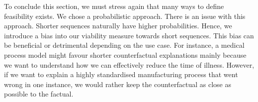 \documentclass[./../../paper.tex]{subfiles}
\begin{document}
To conclude this section, we must stress again that many ways to define feasibility exists. We chose a probabilistic approach. There is an issue with this approach. Shorter sequences naturally have higher probabilities. Hence, we introduce a bias into our viability measure towards short sequences. This bias can be beneficial or detrimental depending on the use case. For instance, a medical process model might favour shorter counterfactual explanations mainly because we want to understand how we can effectively reduce the time of illness. However, if we want to explain a highly standardised manufacturing process that went wrong in one instance, we would rather keep the counterfactual as close as possible to the factual.    






\end{document}
